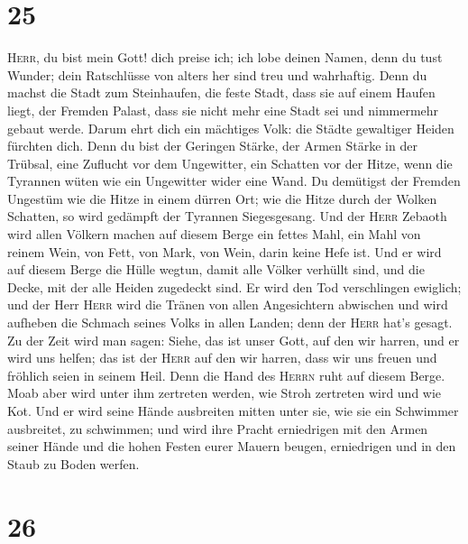 \hypertarget{section-24}{%
\section{25}\label{section-24}}

 \textsc{Herr}, du bist mein Gott! dich preise ich; ich
lobe deinen Namen, denn du tust Wunder; dein Ratschlüsse von alters her
sind treu und wahrhaftig.  Denn du machst die Stadt zum
Steinhaufen, die feste Stadt, dass sie auf einem Haufen liegt, der
Fremden Palast, dass sie nicht mehr eine Stadt sei und nimmermehr gebaut
werde.  Darum ehrt dich ein mächtiges Volk: die Städte
gewaltiger Heiden fürchten dich.  Denn du bist der
Geringen Stärke, der Armen Stärke in der Trübsal, eine Zuflucht vor dem
Ungewitter, ein Schatten vor der Hitze, wenn die Tyrannen wüten wie ein
Ungewitter wider eine Wand.  Du demütigst der Fremden
Ungestüm wie die Hitze in einem dürren Ort; wie die Hitze durch der
Wolken Schatten, so wird gedämpft der Tyrannen Siegesgesang.
 Und der \textsc{Herr} Zebaoth wird allen Völkern machen
auf diesem Berge ein fettes Mahl, ein Mahl von reinem Wein, von Fett,
von Mark, von Wein, darin keine Hefe ist.  Und er wird auf
diesem Berge die Hülle wegtun, damit alle Völker verhüllt sind, und die
Decke, mit der alle Heiden zugedeckt sind.  Er wird den
Tod verschlingen ewiglich; und der Herr \textsc{Herr} wird die Tränen
von allen Angesichtern abwischen und wird aufheben die Schmach seines
Volks in allen Landen; denn der \textsc{Herr} hat's gesagt.
 Zu der Zeit wird man sagen: Siehe, das ist unser Gott,
auf den wir harren, und er wird uns helfen; das ist der \textsc{Herr}
auf den wir harren, dass wir uns freuen und fröhlich seien in seinem
Heil.  Denn die Hand des \textsc{Herrn} ruht auf diesem
Berge. Moab aber wird unter ihm zertreten werden, wie Stroh zertreten
wird und wie Kot.  Und er wird seine Hände ausbreiten
mitten unter sie, wie sie ein Schwimmer ausbreitet, zu schwimmen; und
wird ihre Pracht erniedrigen mit den Armen seiner Hände 
und die hohen Festen eurer Mauern beugen, erniedrigen und in den Staub
zu Boden werfen.

\hypertarget{section-25}{%
\section{26}\label{section-25}}

